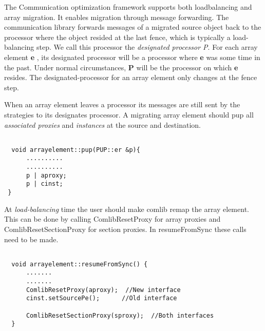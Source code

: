 The Communication optimization framework supports both loadbalancing and array migration. 
It enables migration through message forwarding. The communication library forwards
messages of a migrated source object back to the processor where the
object resided at the last fence, which is typically a load-balancing step.  
We call this processor the {\em designated processor P}. For each array element {\bf e} , its
designated processor will be a processor where {\bf e} was some time
in the past. Under normal circumstances, {\bf P} will be the processor
on which {\bf e} resides. The designated-processor for an array
element only changes at the fence step.

When an array element leaves a processor its messages are still sent 
by the strategies to its designates processor. A migrating array element should pup all {\em associated proxies} 
and {\em instances} at the source and destination.  

\begin{verbatim}

  void arrayelement::pup(PUP::er &p){
      ..........
      ..........
      p | aproxy;
      p | cinst;
 }
\end{verbatim}

At {\em load-balancing} time the user should make comlib remap the array element. This can be done by 
calling ComlibResetProxy for array proxies and ComlibResetSectionProxy for section proxies. In resumeFromSync these 
calls need to be made.

\begin{verbatim}

  void arrayelement::resumeFromSync() {
      .......
      .......
      ComlibResetProxy(aproxy);  //New interface
      cinst.setSourcePe();      //Old interface

      ComlibResetSectionProxy(sproxy);  //Both interfaces
  }

\end{verbatim}